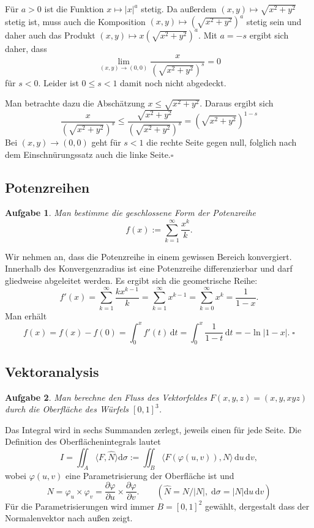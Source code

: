 \documentclass[a4paper,10pt,fleqn,twoside]{scrartcl}
\numberwithin{equation}{section}
\newcommand{\strong}[1]{{\normalfont\sffamily\bfseries #1}}
\renewcommand{\qedsymbol}{\ensuremath{\square}}
\theoremstyle{Aufgabe}
\newtheorem{Aufgabe}{\sffamily Aufgabe}[section]
\begin{document}
Für $a>0$ ist die Funktion $x\mapsto |x|^a$ stetig. Da außerdem
$(x,y)\mapsto\sqrt{x^2+y^2}$ stetig ist, muss auch die Komposition
$(x,y)\mapsto (\sqrt{x^2+y^2})^a$ stetig sein und daher auch das
Produkt $(x,y)\mapsto x(\sqrt{x^2+y^2})^a$. Mit $a=-s$ ergibt sich
daher, dass%
\begin{equation}
\lim_{(x,y)\to (0,0)} \frac{x}{(\sqrt{x^2+y^2})^s} = 0
\end{equation}
für $s<0$. Leider ist $0\le s<1$ damit noch nicht abgedeckt.

Man betrachte dazu die Abschätzung $x\le\sqrt{x^2+y^2}$. Daraus
ergibt sich
\begin{equation}
\frac{x}{(\sqrt{x^2+y^2})^s} \le \frac{\sqrt{x^2+y^2}}{(\sqrt{x^2+y^2})^s}
= (\sqrt{x^2+y^2})^{1-s}
\end{equation}
Bei $(x,y)\to (0,0)$ geht für $s<1$ die rechte Seite gegen null,
folglich nach dem Einschnürungssatz auch die linke Seite.\;\qedsymbol

\subsection{Potenzreihen}
\begin{Aufgabe}
Man bestimme die geschlossene Form der Potenzreihe
\[f(x):=\sum_{k=1}^\infty\frac{x^k}{k}.\]
\end{Aufgabe}
Wir nehmen an, dass die Potenzreihe in einem gewissen Bereich
konvergiert. Innerhalb des Konvergenzradius ist eine
Potenzreihe differenzierbar und darf gliedweise abgeleitet
werden. Es ergibt sich die geometrische Reihe:
\begin{equation}
f'(x) = \sum_{k=1}^\infty \frac{kx^{k-1}}{k}
= \sum_{k=1}^\infty x^{k-1}
= \sum_{k=0}^\infty x^k
= \frac{1}{1-x}.
\end{equation}
Man erhält
\begin{equation}
f(x) = f(x)-f(0) = \int_0^x f'(t)\,\mathrm dt
= \int_0^x \frac{1}{1-t}\,\mathrm dt
= -\ln|1-x|.\;\qedsymbol
\end{equation}

\subsection{Vektoranalysis}
\begin{Aufgabe}
Man berechne den Fluss des Vektorfeldes $F(x,y,z)=(x,y,xyz)$ durch
die Oberfläche des Würfels $[0,1]^3$.
\end{Aufgabe}

\noindent\strong{Lösung.}
Das Integral wird in sechs Summanden zerlegt, jeweils einen für jede
Seite. Die Definition des Oberflächenintegrals lautet
\begin{equation}
I = \iint_A \langle F,\hat N\rangle \mathrm d\sigma
:= \iint_B \langle F(\varphi(u,v)),N\rangle\,\mathrm du\,\mathrm dv,
\end{equation}
wobei $\varphi(u,v)$ eine Parametrisierung der Oberfläche ist und
\[N = \varphi_u\times\varphi_v = \frac{\partial\varphi}{\partial u}\times\frac{\partial\varphi}{\partial v}.
\qquad (\hat N = N/|N|,\;\mathrm d\sigma = |N|\mathrm du\,\mathrm dv)\]
Für die Parametrisierungen wird immer $B=[0,1]^2$ gewählt, dergestalt
dass der Normalenvektor nach außen zeigt.
\end{document}
